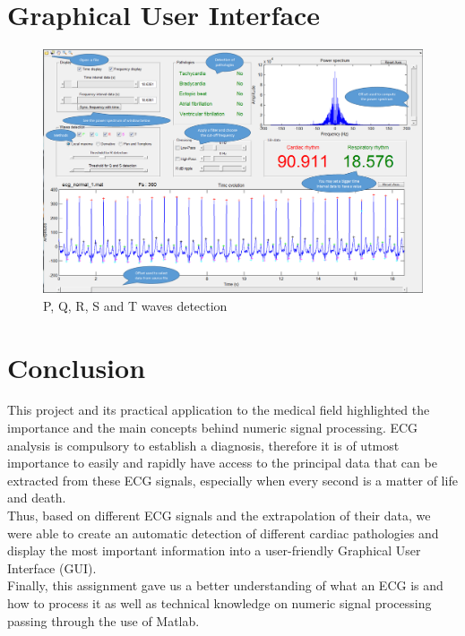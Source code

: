 \documentclass[11pt]{article}
\begin{document}
\section{Graphical User Interface}

			\begin{figure}[h]
				\centering
				\includegraphics[scale=0.45]{images/GUI_bulle.png}
				\caption{P, Q, R, S and T waves detection}
				\label{Q412}
			\end{figure}


\section{Conclusion}
	This project and its practical application to the medical field highlighted the importance and the main concepts behind numeric signal processing. ECG analysis is compulsory to establish a diagnosis, therefore it is of utmost importance to easily and rapidly have access to the principal data that can be extracted from these ECG signals, especially when every second is a matter of life and death.\\
	Thus, based on different ECG signals and the extrapolation of their data, we were able to create an automatic detection of different cardiac pathologies and display the most important information into a user-friendly Graphical User Interface (GUI).\\
	Finally, this assignment gave us a better understanding of what an ECG is and how to process it as well as technical knowledge on numeric signal processing passing through the use of Matlab.\\
\end{document}
